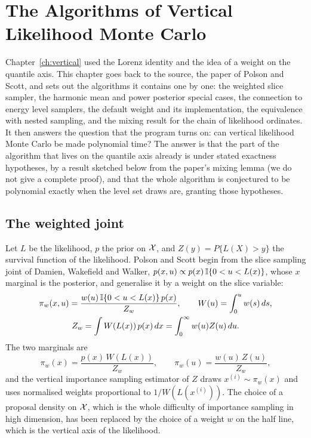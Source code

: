 \chapter{The Algorithms of Vertical Likelihood Monte Carlo}
\label{ch:polsonscott}

Chapter~\ref{ch:vertical} used the Lorenz identity and the idea of a weight on the quantile axis. This chapter goes back to the source, the paper of Polson and Scott, and sets out the algorithms it contains one by one: the weighted slice sampler, the harmonic mean and power posterior special cases, the connection to energy level samplers, the default weight and its implementation, the equivalence with nested sampling, and the mixing result for the chain of likelihood ordinates. It then answers the question that the program turns on: can vertical likelihood Monte Carlo be made polynomial time? The answer is that the part of the algorithm that lives on the quantile axis already is under stated exactness hypotheses, by a result sketched below from the paper's mixing lemma (we do not give a complete proof), and that the whole algorithm is conjectured to be polynomial exactly when the level set draws are, granting those hypotheses.

\section{The weighted joint}

Let $L$ be the likelihood, $p$ the prior on $\mathcal{X}$, and $Z(y) = P\{ L(X) > y \}$ the survival function of the likelihood. Polson and Scott begin from the slice sampling joint of Damien, Wakefield and Walker, $p(x, u) \propto p(x) \, \mathbb{I}\{ 0 < u < L(x) \}$, whose $x$ marginal is the posterior, and generalise it by a weight on the slice variable:
\[
\begin{gathered}
\pi_w(x, u) = \frac{ w(u) \, \mathbb{I}\{ 0 < u < L(x) \} \, p(x) }{ Z_w } , \qquad W(u) = \int_0^u w(s) \, ds , \\
Z_w = \int W(L(x)) \, p(x) \, dx = \int_0^\infty w(u) Z(u) \, du .
\end{gathered}
\]
The two marginals are
\[
\pi_w(x) = \frac{ p(x) \, W(L(x)) }{ Z_w } , \qquad \pi_w(u) = \frac{ w(u) \, Z(u) }{ Z_w } ,
\]
and the vertical importance sampling estimator of $Z$ draws $x^{(i)} \sim \pi_w(x)$ and uses normalised weights proportional to $1 / W(L(x^{(i)}))$. The choice of a proposal density on $\mathcal{X}$, which is the whole difficulty of importance sampling in high dimension, has been replaced by the choice of a weight $w$ on the half line, which is the vertical axis of the likelihood.

